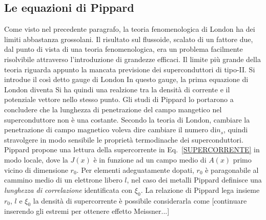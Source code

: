 \subsection{Le equazioni di Pippard}
Come visto nel precedente paragrafo, la teoria fenomenologica di London ha dei limiti abbastanza grossolani. Il risultato sul flussoide, scalato di un fattore due, dal punto di vista di una teoria fenomenologica, era un problema facilmente risolvibile attraverso l'introduzione di grandezze efficaci. Il limite pi\`u grande della teoria riguarda appunto la mancata previsione dei superconduttori di tipo-II. Si introdue il cos\`i detto gauge di London
In questo gauge, la prima equazione di London diventa
Si ha quindi una realzione tra la densit\`a di corrente e il potenziale vettore nello stesso punto. Gli studi di Pippard lo portarono a concludere che la lunghezza di penetrazione del campo mangetico nel superconduttore non \`e una costante. Secondo la teoria di London, cambiare la penetrazione di campo magnetico voleva dire cambiare il numero di$ n_s$, quindi stravolgere in modo sensibile le propriet\`a termodinache dei superconduttori. Pippard propone una lettura della supercorrente in Eq.~\ref{SUPERCORRENTE} in modo locale, dove la $J(x)$ \`e in funzione ad un campo medio di $A(x)$ primo vicino di dimensione $r_0$. Per elementi adeguatamente dopati, $r_0$ \`e paragonabile al cammino medio di un elettrone libero $l$, nel caso dei metalli Pippard definisce una \textit{lunghezza di correlazione} identificata con $\xi_0$. La relazione di Pippard lega insieme $r_0$, $l$ e $\xi_0$
la densit\`a di supercorrente \`e possibile considerarla come
[continuare inserendo gli estremi per ottenere effetto Meissner...]




